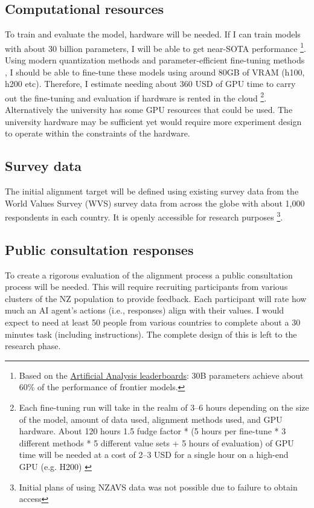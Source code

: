\subsection{Computational resources}

To train and evaluate the model, hardware will be needed. If I can train models with about 30 billion parameters, I will be able to get near-SOTA performance \footnote{Based on the \href{https://artificialanalysis.ai/leaderboards}{Artificial Analysis leaderboards}: 30B parameters achieve about 60\% of the performance of frontier models.}. Using modern quantization methods \cite{dettmersQLoRAEfficientFinetuning2023,dettmersLLMint88bitMatrix2022} and parameter-efficient fine-tuning methods \cite{huLoRALowRankAdaptation2021,dettmersQLoRAEfficientFinetuning2023}, I should be able to fine-tune these models using around 80GB of VRAM (h100, h200 etc). Therefore, I estimate needing about 360 USD of GPU time to carry out the fine-tuning and evaluation if hardware is rented in the cloud \footnote{Each fine-tuning run will take in the realm of 3--6 hours depending on the size of the model, amount of data used, alignment methods used, and GPU hardware. About 120 hours 1.5 fudge factor * (5 hours per fine-tune * 3 different methods * 5 different value sets + 5 hours of evaluation) of GPU time will be needed at a cost of 2--3 USD for a single hour on a high-end GPU (e.g. H200) \cite{vastai2026}}. Alternatively the university has some GPU resources that could be used. The university hardware may be sufficient yet would require more experiment design to operate within the constraints of the hardware.

\subsection{Survey data}

The initial alignment target will be defined using existing survey data from the World Values Survey (WVS) \cite{WVS2020} survey data from across the globe with about 1,000 respondents in each country. It is openly accessible for research purposes \footnote{Initial plans of using NZAVS data was not possible due to failure to obtain access}.

\subsection{Public consultation responses}

To create a rigorous evaluation of the alignment process a public consultation process will be needed. This will require recruiting participants from various clusters of the NZ population to provide feedback. Each participant will rate how much an AI agent's actions (i.e., responses) align with their values. I would expect to need at least 50 people from various countries to complete about a 30 minutes task (including instructions). The complete design of this is left to the research phase.

